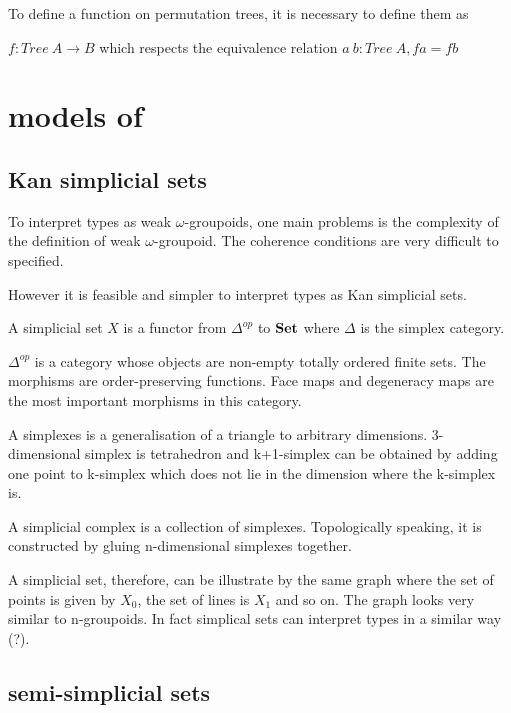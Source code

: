 To define a function on permutation trees, it is necessary to define
them as

$f : Tree~A \rightarrow B$ which respects the equivalence relation
$a~b : Tree~A, f a = f b$

\section{models of \hott}

\subsection{Kan simplicial sets}

To interpret types as weak $\omega$-groupoids, one main problems is
the complexity of the definition of weak $\omega$-groupoid. The
coherence conditions are very difficult to specified.

However it is feasible and simpler to interpret types as Kan
simplicial sets.

\begin{definition}
A simplicial set $X$ is a functor from $\Delta^{op}$ to $\operatorname{\mathbf{Set}}$ where
$\Delta$ is the simplex category.
\end{definition}

$\Delta^{op}$ is a category whose objects are non-empty totally ordered
finite sets. The morphisms are order-preserving functions. 
Face maps and degeneracy maps are the most important morphisms in this
category.  

A simplexes is a generalisation of a triangle to arbitrary
dimensions. 3-dimensional simplex is tetrahedron and k+1-simplex can
be obtained by adding one point to k-simplex which does not lie in the
dimension where the k-simplex is.

A simplicial complex is a collection of simplexes. Topologically speaking, it
is constructed by gluing n-dimensional simplexes together. 

A simplicial set, therefore, can be illustrate by the same graph where
the set of points is given by $X_0$, the set of lines is $X_1$ and so
on. The graph looks very similar to n-groupoids. In fact simplical
sets can interpret types in a similar way (?).


\subsection{semi-simplicial sets}

